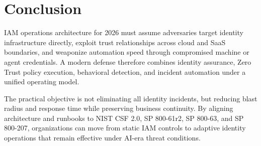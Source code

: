\documentclass[11pt]{article}
\begin{document}
\section{Conclusion}
IAM operations architecture for 2026 must assume adversaries target identity infrastructure directly, exploit trust relationships across cloud and SaaS boundaries, and weaponize automation speed through compromised machine or agent credentials. A modern defense therefore combines identity assurance, Zero Trust policy execution, behavioral detection, and incident automation under a unified operating model.

The practical objective is not eliminating all identity incidents, but reducing blast radius and response time while preserving business continuity. By aligning architecture and runbooks to NIST CSF 2.0, SP 800-61r2, SP 800-63, and SP 800-207, organizations can move from static IAM controls to adaptive identity operations that remain effective under AI-era threat conditions.



\end{document}
